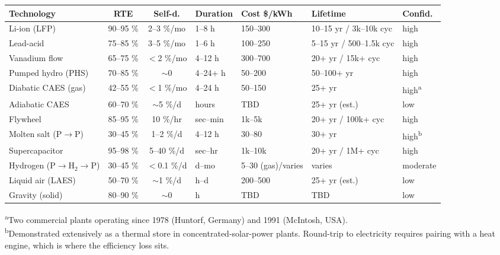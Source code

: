 \begin{footnotesize}
\begin{tabular}{|l|c|c|l|l|l|l|}
\hline
\textbf{Technology} & \textbf{RTE} & \textbf{Self-d.}
  & \textbf{Duration} & \textbf{Cost \$/kWh} & \textbf{Lifetime}
  & \textbf{Confid.} \\
\hline
Li-ion (LFP)        & 90--95 \% & 2--3 \%/mo  & 1--8 h        & 150--300   & 10--15 yr / 3k--10k cyc & high \\
Lead-acid           & 75--85 \% & 3--5 \%/mo  & 1--6 h        & 100--250   & 5--15 yr / 500--1.5k cyc & high \\
Vanadium flow       & 65--75 \% & $<$2 \%/mo  & 4--12 h       & 300--700   & 20+ yr / 15k+ cyc      & high \\
Pumped hydro (PHS)  & 70--85 \% & $\sim$0     & 4--24+ h      & 50--200    & 50--100+ yr            & high \\
Diabatic CAES (gas) & 42--55 \% & $<$1 \%/mo  & 4--24 h       & 50--150    & 25+ yr                 & high\textsuperscript{a} \\
Adiabatic CAES      & 60--70 \% & $\sim$5 \%/d & hours         & TBD        & 25+ yr (est.)          & low \\
Flywheel            & 85--95 \% & 10 \%/hr   & sec--min      & 1k--5k     & 20+ yr / 100k+ cyc     & high \\
Molten salt (P$\to$P)& 30--45 \%& 1--2 \%/d   & 4--12 h       & 30--80     & 30+ yr                 & high\textsuperscript{b} \\
Supercapacitor      & 95--98 \% & 5--40 \%/d  & sec--hr       & 1k--10k    & 20+ yr / 1M+ cyc       & high \\
Hydrogen (P$\to$H$_2\to$P) & 30--45 \% & $<$0.1 \%/d & d--mo & 5--30 (gas)/varies & varies & moderate \\
Liquid air (LAES)   & 50--70 \% & $\sim$1 \%/d & h--d          & 200--500   & 25+ yr (est.)          & low \\
Gravity (solid)     & 80--90 \% & $\sim$0     & h             & TBD        & TBD                    & low \\
\hline
\end{tabular}

\medskip\noindent
\textsuperscript{a}Two commercial plants operating since 1978 (Huntorf,
Germany) and 1991 (McIntosh, USA). \\
\textsuperscript{b}Demonstrated extensively as a thermal store in
concentrated-solar-power plants. Round-trip to electricity requires
pairing with a heat engine, which is where the efficiency loss sits.
\end{footnotesize}

